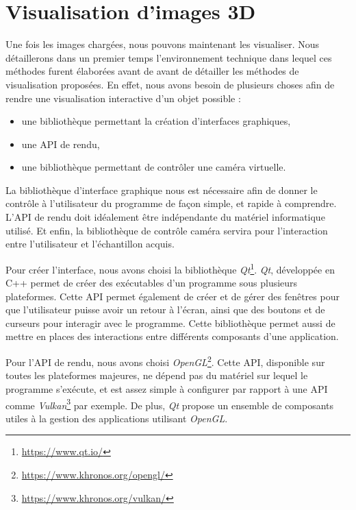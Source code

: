 \chapter{Visualisation d'images 3D}\label{chapter:04:visualisation}
{
	Une fois les images chargées, nous pouvons maintenant les visualiser. Nous détaillerons dans un premier temps l'environnement technique dans lequel ces méthodes furent élaborées avant de avant de détailler les méthodes de visualisation proposées. En effet, nous avons besoin de plusieurs choses afin de rendre une visualisation interactive d'un objet possible :\begin{itemize}
		\item une bibliothèque permettant la création d'interfaces graphiques,
		\item une API de rendu,
		\item une bibliothèque permettant de contrôler une caméra virtuelle.
	\end{itemize}

	La bibliothèque d'interface graphique nous est nécessaire afin de donner le contrôle à l'utilisateur du programme de façon simple, et rapide à comprendre. L'API de rendu doit idéalement être indépendante du matériel informatique utilisé. Et enfin, la bibliothèque de contrôle caméra servira pour l'interaction entre l'utilisateur et l'échantillon acquis.

	Pour créer l'interface, nous avons choisi la bibliothèque \textit{Qt}\footnote{\url{https://www.qt.io/}}. \textit{Qt}, développée en C++ permet de créer des exécutables d'un programme sous plusieurs plateformes. Cette API permet également de créer et de gérer des fenêtres pour que l'utilisateur puisse avoir un retour à l'écran, ainsi que des boutons et de curseurs pour interagir avec le programme. Cette bibliothèque permet aussi de mettre en places des interactions entre différents composants d'une application.
	
	Pour l'API de rendu, nous avons choisi \textit{OpenGL}\footnote{\url{https://www.khronos.org/opengl/}}. Cette API, disponible sur toutes les plateformes majeures, ne dépend pas du matériel sur lequel le programme s'exécute, et est assez simple à configurer par rapport à une API comme \textit{Vulkan}\footnote{\url{https://www.khronos.org/vulkan/}} par exemple. De plus, \textit{Qt} propose un ensemble de composants utiles à la gestion des applications utilisant \textit{OpenGL}.
	
}
